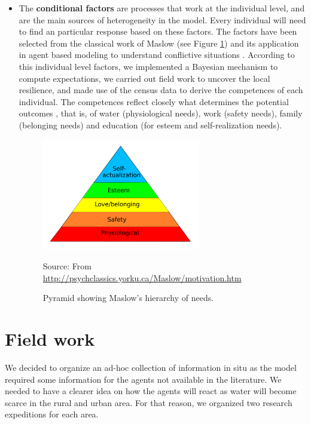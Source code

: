 \documentclass{article}
\begin{document}
\begin{itemize}
\item The {\bf conditional factors} are processes that work at the individual level, and are the main sources of heterogeneity in the model. Every individual will need to find an particular response based on these factors. The factors have been selected from the classical work of Maslow \cite{maslow_motivation_1987} (see Figure \ref{maslow}) and its application in agent based modeling to understand conflictive situations \cite{watkins_understanding_2008}. According to this individual level factors, we implemented a Bayesian mechanism to compute expectations, we carried out field work to uncover the local resilience, and made use of the census data to derive the competences of each individual. The competences reflect closely what determines the potential outcomes \cite{watkins_understanding_2008}, that is, of water (physiological needs), work (safety needs), family (belonging needs) and education (for esteem and self-realization needs).  

  \begin{figure}[h]
    \centering
    \includegraphics[width=0.65\textwidth]{maslow}
    \caption[Hierarchy of Maslow]{Pyramid showing Maslow's hierarchy of needs.}
    Source: From \url{http://psychclassics.yorku.ca/Maslow/motivation.htm}
    \label{maslow}
  \end{figure}

\end{itemize}



\section{Field work}

We decided to organize an ad-hoc collection of information in situ as the model required some information for the agents not available in the literature. We needed to have a clearer idea on how the agents will react as water will become scarce in the rural and urban area. For that reason, we organized two research expeditions for each area.
\end{document}
